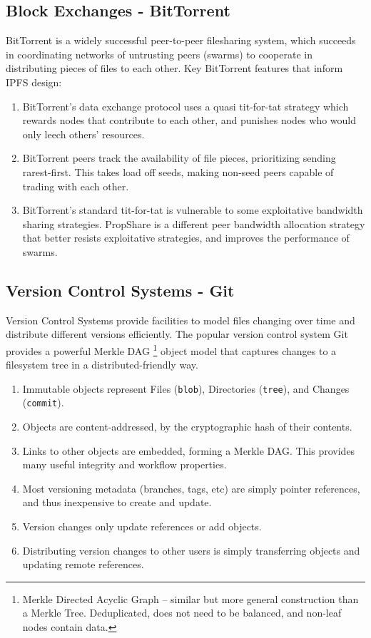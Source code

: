 \documentclass{sig-alternate}
\begin{document}
\subsection{Block Exchanges - BitTorrent}

BitTorrent \cite{BitTorrent} is a widely successful peer-to-peer filesharing system, which succeeds in coordinating networks of untrusting peers (swarms) to cooperate in distributing pieces of files to each other. Key BitTorrent features that inform IPFS design:

\begin{enumerate}
  \item BitTorrent's data exchange protocol uses a quasi tit-for-tat strategy
        which rewards nodes that contribute to each other, and punishes nodes who would only leech others' resources.

  \item BitTorrent peers track the availability of file pieces, prioritizing
        sending rarest-first. This takes load off seeds, making non-seed peers capable of trading with each other.

  \item BitTorrent's standard tit-for-tat is vulnerable to some exploitative
        bandwidth sharing strategies. PropShare \cite{propshare} is a different peer bandwidth allocation strategy that better resists exploitative strategies, and improves the performance of swarms.

\end{enumerate}

\subsection{Version Control Systems - Git}

Version Control Systems provide facilities to model files changing over time and distribute different versions efficiently. The popular version control system Git provides a powerful Merkle DAG \footnote{Merkle Directed Acyclic Graph -- similar but more general construction than a Merkle Tree. Deduplicated, does not need to be balanced, and non-leaf nodes contain data.} object model that captures changes to a filesystem tree in a distributed-friendly way.

\begin{enumerate}
  \item Immutable objects represent Files (\texttt{blob}), Directories (\texttt{tree}), and Changes (\texttt{commit}).
  \item Objects are content-addressed, by the cryptographic hash of their contents.
  \item Links to other objects are embedded, forming a Merkle DAG. This
  provides many useful integrity and workflow properties.
  \item Most versioning metadata (branches, tags, etc) are simply pointer references, and thus inexpensive to create and update.
  \item Version changes only update references or add objects.
  \item Distributing version changes to other users is simply transferring objects and updating remote references.
\end{enumerate}
\end{document}
